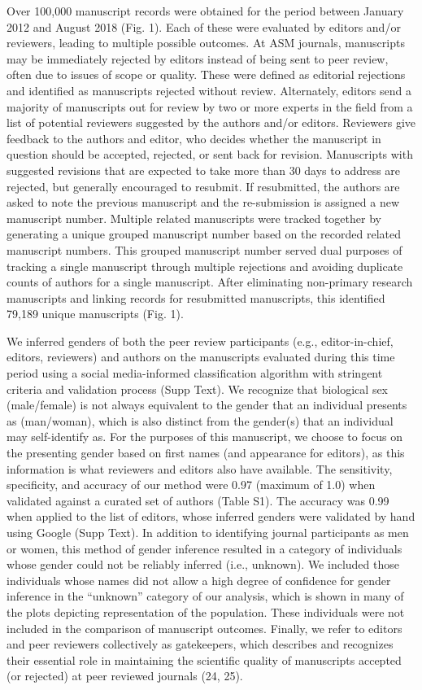 \documentclass[11pt,]{article}
\begin{document}
Over 100,000 manuscript records were obtained for the period between
January 2012 and August 2018 (Fig. 1). Each of these were evaluated by
editors and/or reviewers, leading to multiple possible outcomes. At ASM
journals, manuscripts may be immediately rejected by editors instead of
being sent to peer review, often due to issues of scope or quality.
These were defined as editorial rejections and identified as manuscripts
rejected without review. Alternately, editors send a majority of
manuscripts out for review by two or more experts in the field from a
list of potential reviewers suggested by the authors and/or editors.
Reviewers give feedback to the authors and editor, who decides whether
the manuscript in question should be accepted, rejected, or sent back
for revision. Manuscripts with suggested revisions that are expected to
take more than 30 days to address are rejected, but generally encouraged
to resubmit. If resubmitted, the authors are asked to note the previous
manuscript and the re-submission is assigned a new manuscript number.
Multiple related manuscripts were tracked together by generating a
unique grouped manuscript number based on the recorded related
manuscript numbers. This grouped manuscript number served dual purposes
of tracking a single manuscript through multiple rejections and avoiding
duplicate counts of authors for a single manuscript. After eliminating
non-primary research manuscripts and linking records for resubmitted
manuscripts, this identified 79,189 unique manuscripts (Fig. 1).

We inferred genders of both the peer review participants (e.g.,
editor-in-chief, editors, reviewers) and authors on the manuscripts
evaluated during this time period using a social media-informed
classification algorithm with stringent criteria and validation process
(Supp Text). We recognize that biological sex (male/female) is not
always equivalent to the gender that an individual presents as
(man/woman), which is also distinct from the gender(s) that an
individual may self-identify as. For the purposes of this manuscript, we
choose to focus on the presenting gender based on first names (and
appearance for editors), as this information is what reviewers and
editors also have available. The sensitivity, specificity, and accuracy
of our method were 0.97 (maximum of 1.0) when validated against a
curated set of authors (Table S1). The accuracy was 0.99 when applied to
the list of editors, whose inferred genders were validated by hand using
Google (Supp Text). In addition to identifying journal participants as
men or women, this method of gender inference resulted in a category of
individuals whose gender could not be reliably inferred (i.e., unknown).
We included those individuals whose names did not allow a high degree of
confidence for gender inference in the ``unknown'' category of our
analysis, which is shown in many of the plots depicting representation
of the population. These individuals were not included in the comparison
of manuscript outcomes. Finally, we refer to editors and peer reviewers
collectively as gatekeepers, which describes and recognizes their
essential role in maintaining the scientific quality of manuscripts
accepted (or rejected) at peer reviewed journals (24, 25).
\end{document}

